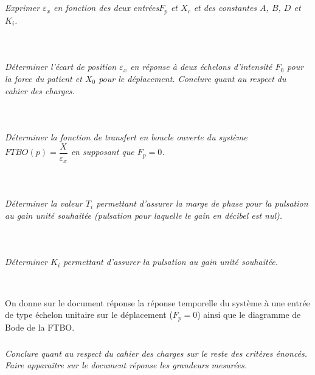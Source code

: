 \documentclass[10pt,fleqn]{article} %
\begin{document}
\begin{multicols}{2}
\subparagraph{}\textit{Exprimer $\varepsilon_x$ en fonction des deux entrées$F_p$ et $X_c$ et des constantes $A$, $B$, $D$ et $K_i$.}
\ifprof
\begin{corrige}~\\
\end{corrige}
\else
\fi

\subparagraph{}\textit{Déterminer l'écart de position $\varepsilon_x$ en réponse à deux échelons d'intensité $F_0$ pour la force du patient et $X_0$ pour le déplacement. Conclure quant au respect du cahier des charges.}
\ifprof
\begin{corrige}~\\
\end{corrige}
\else
\fi


\subparagraph{}\textit{Déterminer la fonction de transfert en boucle ouverte du système $FTBO(p)=\dfrac{X}{\varepsilon_x}$ en supposant que $F_p=0$.}
\ifprof
\begin{corrige}~\\
\end{corrige}
\else
\fi

\subparagraph{}\textit{Déterminer la valeur $T_i$ permettant d'assurer la marge de phase pour la pulsation au gain unité souhaitée (pulsation pour laquelle le gain en décibel est nul).}
\ifprof
\begin{corrige}~\\
\end{corrige}
\else
\fi


\subparagraph{}\textit{Déterminer $K_i$ permettant d'assurer la pulsation au gain unité souhaitée.}


\ifprof
\begin{corrige}~\\
\end{corrige}
\else
\fi

On donne sur le document réponse la réponse temporelle du système à une entrée de type échelon unitaire sur le déplacement ($F_p=0$) ainsi que le diagramme de Bode de la FTBO.

\subparagraph{}\textit{Conclure quant au respect du cahier des charges sur le reste des critères énoncés. Faire apparaître sur le document réponse les grandeurs mesurées.}
\ifprof
\begin{corrige}~\\
\end{corrige}
\else
\fi

\ifprof
\else
\end{multicols}
\fi
\end{document}
